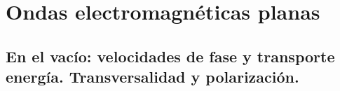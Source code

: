 \documentclass[11pt,fleqn]{book} %
\begin{document}

\pagestyle{empty} %
\tableofcontents %
\cleardoublepage %

\pagestyle{fancy} %


\chapter{Ondas electromagn\'eticas planas}
\section{En el vac\'io: velocidades de fase y transporte energ\'ia. Transversalidad y polarizaci\'on.}
\end{document}
